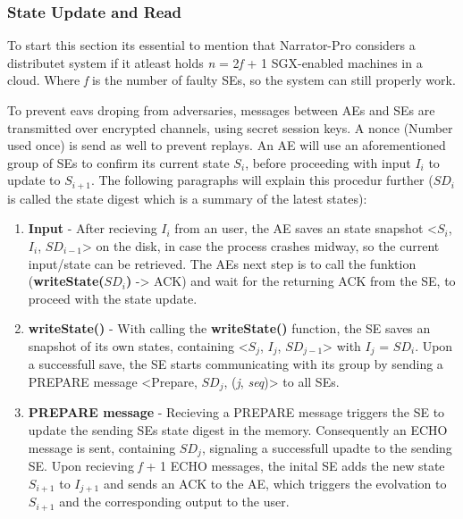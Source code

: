 \subsubsection{State Update and Read}


To start this section its essential to mention that Narrator-Pro considers a distributet system if it atleast holds \textit{n} = 2\textit{f} + 1 SGX-enabled machines in a cloud. Where \textit{f} is the number of faulty SEs, so the system can still properly work.

To prevent eavs droping from adversaries, messages between AEs and SEs are transmitted over encrypted channels, using secret session keys. A nonce (Number used once) is send as well to prevent replays. An AE will use an aforementioned group of SEs to confirm its current state \(S_i\), before proceeding with input \(I_i\) to update to \(S_{i+1}\). The following paragraphs will explain this procedur further (\(SD_{i}\) is called the state digest which is a summary of the latest states):

\begin{enumerate}
    \item \textbf{Input} - After recieving \(I_i\) from an user, the AE saves an state snapshot <\(S_i\), \(I_i\), \(SD_{i-1}\)> on the disk, in case the process crashes midway, so the current input/state can be retrieved. The AEs next step is to call the funktion (\textbf{writeState(\(SD_i\))} -> ACK) and wait for the returning ACK from the SE, to proceed with the state update.
    \item \textbf{writeState()} - With calling the \textbf{writeState()} function, the SE saves an snapshot of its own states, containing <\(S_j\), \(I_j\), \(SD_{j-1}\)> with \(I_j\) = \(SD_{i}\). Upon a successfull save, the SE starts communicating with its group by sending a PREPARE message <Prepare, \(SD_{j}\), (\textit{j}, \textit{seq})> to all SEs.
    \item \textbf{PREPARE message} - Recieving a PREPARE message triggers the SE to update the sending SEs state digest in the memory. Consequently an ECHO message is sent, containing  \(SD_{j}\), signaling a successfull upadte to the sending SE. Upon recieving \textit{f} + 1 ECHO messages, the inital SE adds the new state \(S_{i+1}\) to \(I_{j+1}\) and sends an ACK to the AE, which triggers the evolvation to \(S_{i+1}\) and the corresponding output to the user.
\end{enumerate}

